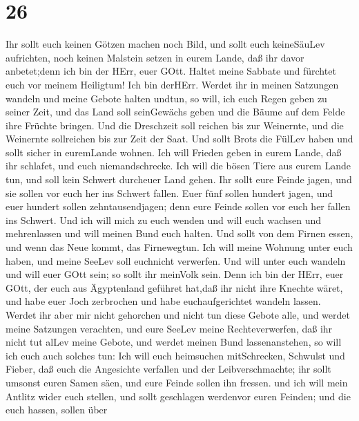 \hypertarget{section-25}{%
\section{26}\label{section-25}}

 Ihr sollt euch keinen Götzen machen noch Bild, und sollt
euch keineSäuLev aufrichten, noch keinen Malstein setzen in eurem Lande,
daß ihr davor anbetet;denn ich bin der HErr, euer GOtt. 
Haltet meine Sabbate und fürchtet euch vor meinem Heiligtum! Ich bin
derHErr.  Werdet ihr in meinen Satzungen wandeln und meine
Gebote halten undtun,  so will, ich euch Regen geben zu
seiner Zeit, und das Land soll seinGewächs geben und die Bäume auf dem
Felde ihre Früchte bringen.  Und die Dreschzeit soll reichen
bis zur Weinernte, und die Weinernte sollreichen bis zur Zeit der Saat.
Und sollt Brots die FülLev haben und sollt sicher in euremLande wohnen.
 Ich will Frieden geben in eurem Lande, daß ihr schlafet,
und euch niemandschrecke. Ich will die bösen Tiere aus eurem Lande tun,
und soll kein Schwert durcheuer Land gehen.  Ihr sollt eure
Feinde jagen, und sie sollen vor euch her ins Schwert fallen.
 Euer fünf sollen hundert jagen, und euer hundert sollen
zehntausendjagen; denn eure Feinde sollen vor euch her fallen ins
Schwert.  Und ich will mich zu euch wenden und will euch
wachsen und mehrenlassen und will meinen Bund euch halten. 
Und sollt von dem Firnen essen, und wenn das Neue kommt, das
Firnewegtun.  Ich will meine Wohnung unter euch haben, und
meine SeeLev soll euchnicht verwerfen.  Und will unter euch
wandeln und will euer GOtt sein; so sollt ihr meinVolk sein.
 Denn ich bin der HErr, euer GOtt, der euch aus Ägyptenland
geführet hat,daß ihr nicht ihre Knechte wäret, und habe euer Joch
zerbrochen und habe euchaufgerichtet wandeln lassen. 
Werdet ihr aber mir nicht gehorchen und nicht tun diese Gebote alle,
 und werdet meine Satzungen verachten, und eure SeeLev
meine Rechteverwerfen, daß ihr nicht tut alLev meine Gebote, und werdet
meinen Bund lassenanstehen,  so will ich euch auch solches
tun: Ich will euch heimsuchen mitSchrecken, Schwulst und Fieber, daß
euch die Angesichte verfallen und der Leibverschmachte; ihr sollt
umsonst euren Samen säen, und eure Feinde sollen ihn fressen.
 und ich will mein Antlitz wider euch stellen, und sollt
geschlagen werdenvor euren Feinden; und die euch hassen, sollen über
